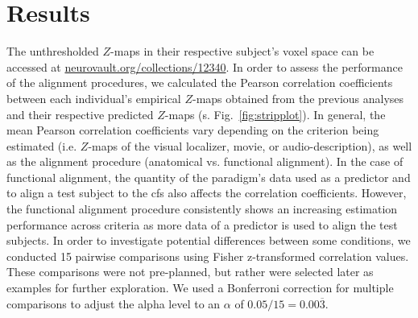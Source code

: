 \section{Results}


\begin{comment}

``Because the localizer task comprises several scanning runs, we calculated the
reliability of the localizer across runs with Cronbach's $\alpha$ to provide an
estimate of the noise ceiling for these correlations'' \citep{jiahui2022cross}.

\end{comment}


The unthresholded $Z$-maps in their respective subject's voxel space can be
accessed at
\href{https://identifiers.org/neurovault.collection:12340}{\url{neurovault.org/collections/12340}}.
%
In order to assess the performance of the alignment procedures, we calculated
the Pearson correlation coefficients between each individual's empirical
$Z$-maps obtained from the previous analyses \citep{haeusler2022processing,
sengupta2016extension} and their respective predicted $Z$-maps (s.
Fig.~\ref{fig:stripplot}).
%
In general, the mean Pearson correlation coefficients vary depending on the
criterion being estimated (i.e. $Z$-maps of the visual localizer, movie, or
audio-description), as well as the alignment procedure (anatomical vs.
functional alignment).
%
In the case of functional alignment, the quantity of the paradigm's data used as
a predictor and to align a test subject to the \ac{cfs} also affects the
correlation coefficients.
%
However, the functional alignment procedure consistently shows an increasing
estimation performance across criteria as more data of a predictor is used to
align the test subjects.
%
In order to investigate potential differences between some conditions, we
conducted 15 pairwise comparisons using Fisher z-transformed correlation values.
%
These comparisons were not pre-planned, but rather were selected later as
examples for further exploration.
%
We used a Bonferroni correction for multiple comparisons to adjust the alpha
level to an $\alpha$ of $0.05 / 15 = 0.00\overline{3}$.


